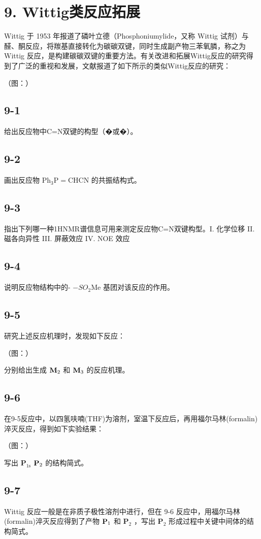 \section*{9. Wittig类反应拓展}
Wittig 于 1953 年报道了磷叶⽴德（Phosphoniumylide，⼜称 Wittig 试剂）与醛、酮反应，将羰基直接转化为碳碳双键，同时⽣成副产物三苯氧膦，称之为 Wittig 反应，是构建碳碳双键的重要⽅法。有关改进和拓展Wittig反应的研究得到了⼴泛的重视和发展，⽂献报道了如下所⽰的类似Wittig反应的研究：

（图：）

\subsection*{9-1}
给出反应物中C=N双键的构型（�或�）。

\subsection*{9-2}
画出反应物 $\mathrm { P h _ { 3 } P { = } C H C N }$ 的共振结构式。

\subsection*{9-3}
指出下列哪⼀种1HNMR谱信息可⽤来测定反应物C=N双键构型。I. 化学位移 II. 磁各向异性 III. 屏蔽效应 IV. NOE 效应

\subsection*{9-4}
说明反应物结构中的- $- S O _ { 2 } \mathrm { M e }$ 基团对该反应的作⽤。

\subsection*{9-5}
研究上述反应机理时，发现如下反应：

（图：）

分别给出⽣成 ${ { \bf { M } } _ { 2 } }$ 和 ${ { \bf { M } } _ { 3 } }$ 的反应机理。

\subsection*{9-6}
在9-5反应中，以四氢呋喃(THF)为溶剂，室温下反应后，再⽤福尔⻢林(formalin)淬灭反应，得到如下实验结果：

（图：）

写出 $\mathbf { P } _ { 1 \mathrm { s } }$ ${ \bf P } _ { 2 }$ 的结构简式。

\subsection*{9-7}
Wittig 反应⼀般是在⾮质⼦极性溶剂中进⾏，但在 9-6 反应中，⽤福尔⻢林(formalin)淬灭反应得到了产物 ${ \bf P } _ { 1 }$ 和 $\mathbf { P } _ { 2 }$ ，写出 $\mathbf { P } _ { 2 }$ 形成过程中关键中间体的结构简式。
